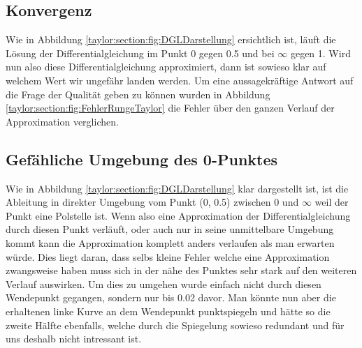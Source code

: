 \subsection{Konvergenz}
\label{taylor:subsection:Konvergenz}
Wie in Abbildung 
\ref{taylor:section:fig:DGLDarstellung}
ersichtlich ist, läuft die Lösung der Differentialgleichung im Punkt 0 gegen 0.5 und bei $\infty$ gegen 1.
Wird nun also diese Differentialgleichung approximiert, dann ist sowieso klar auf welchem Wert wir ungefähr landen werden.
Um eine aussagekräftige Antwort auf die Frage der Qualität geben zu können wurden in Abbildung \ref{taylor:section:fig:FehlerRungeTaylor} die Fehler über den ganzen Verlauf der Approximation verglichen.

\subsection{Gefähliche Umgebung des 0-Punktes}
\label{taylor:subsection:0Punkt}
Wie in Abbildung 
\ref{taylor:section:fig:DGLDarstellung}
klar dargestellt ist, ist die Ableitung in direkter Umgebung vom Punkt (0, 0.5) zwischen 0 und $\infty$ weil der Punkt eine Polstelle ist.
Wenn also eine Approximation der Differentialgleichung durch diesen Punkt verläuft, oder auch nur in seine unmittelbare Umgebung kommt kann die Approximation komplett anders verlaufen als man erwarten würde.
Dies liegt daran, dass selbs kleine Fehler welche eine Approximation zwangsweise haben muss sich in der nähe des Punktes sehr stark auf den weiteren Verlauf auswirken.
Um dies zu umgehen wurde einfach nicht durch diesen Wendepunkt gegangen, sondern nur bis 0.02 davor.
Man könnte nun aber die erhaltenen linke Kurve an dem Wendepunkt punktspiegeln und hätte so die zweite Hälfte ebenfalls, welche durch die Spiegelung sowieso redundant und für uns deshalb nicht intressant ist.



